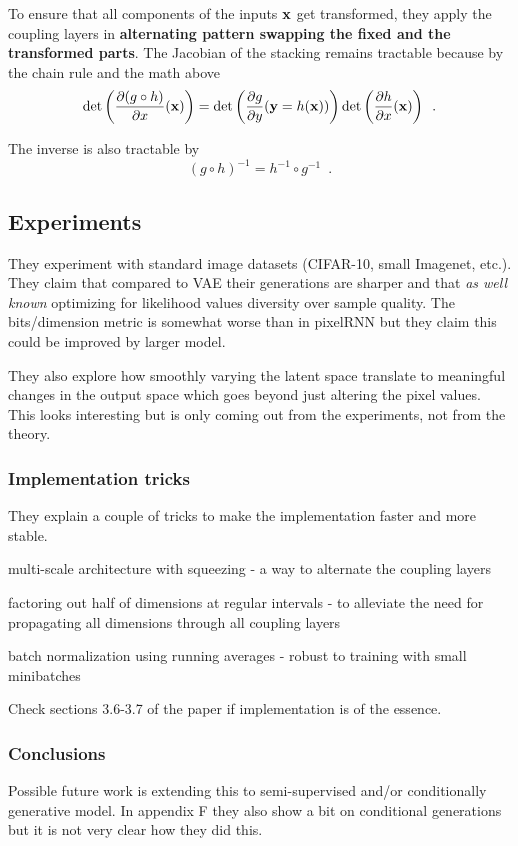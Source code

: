To ensure that all components of the inputs $\mathbf{x}$ get transformed, they apply the coupling layers in \textbf{alternating pattern swapping the fixed and the transformed parts}.
The Jacobian of the stacking remains tractable because by the chain rule and the math above
\begin{equation}
\det \left( \frac{\partial (g \circ h)}{\partial x}(\mathbf{x}) \right) = \det \left(\frac{\partial g}{\partial y}(\mathbf{y} = h(\mathbf{x})) \right)  \det \left(\frac{\partial h}{\partial x}(\mathbf{x})\right) \enspace .
\end{equation}

The inverse is also tractable by
\begin{equation}
(g \circ h)^{-1} = h^{-1} \circ g^{-1} \enspace .
\end{equation}

\subsection{Experiments}

They experiment with standard image datasets (CIFAR-10, small Imagenet, etc.). They claim that compared to VAE their generations are sharper and that \emph{as well known} optimizing for likelihood values diversity over sample quality. The bits/dimension metric is somewhat worse than in pixelRNN but they claim this could be improved by larger model. 

They also explore how smoothly varying the latent space translate to meaningful changes in the output space which goes beyond just altering the pixel values. This looks interesting but is only coming out from the experiments, not from the theory.

\subsubsection{Implementation tricks}

They explain a couple of tricks to make the implementation faster and more stable.
\begin{compactitem}
\item multi-scale architecture with squeezing - a way to alternate the coupling layers
\item factoring out half of dimensions at regular intervals - to alleviate the need for propagating all dimensions through all coupling layers
\item batch normalization using running averages - robust to training with small minibatches
\end{compactitem}
Check sections 3.6-3.7 of the paper if implementation is of the essence.

\subsubsection{Conclusions}

Possible future work is extending this to semi-supervised and/or conditionally generative model.
In appendix F they also show a bit on conditional generations but it is not very clear how they did this.





